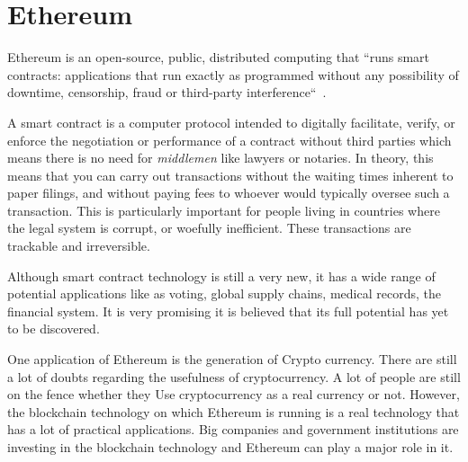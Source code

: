 \section{Ethereum}

Ethereum is an open-source, public, distributed computing that ``runs
smart contracts: applications that run exactly as programmed without
any possibility of downtime, censorship, fraud or third-party
interference``~\cite{hid-sp18-506-EthereumOrg}.

A smart contract is a computer protocol intended to digitally
facilitate, verify, or enforce the negotiation or performance of a
contract without third parties which means there is no need for
\emph{middlemen} like lawyers or notaries. In theory, this means that
you can carry out transactions without the waiting times inherent to
paper filings, and without paying fees to whoever would typically
oversee such a transaction.  This is particularly important for people
living in countries where the legal system is corrupt, or woefully
inefficient.  These transactions are trackable and irreversible.

Although smart contract technology is still a very new, it has a wide
range of potential applications like as voting, global supply chains,
medical records, the financial system.  It is very promising it is
believed that its full potential has yet to be discovered.


One application of Ethereum is the generation of Crypto
currency. There are still a lot of doubts regarding the usefulness of
cryptocurrency. A lot of people are still on the fence whether they
Use cryptocurrency as a real currency or not. However, the blockchain
technology on which Ethereum is running is a real technology that has
a lot of practical applications. Big companies and government
institutions are investing in the blockchain technology and Ethereum
can play a major role in it.
